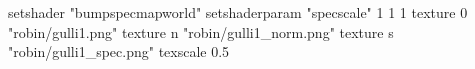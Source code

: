 setshader "bumpspecmapworld"
setshaderparam "specscale" 1 1 1
   texture 0 "robin/gulli1.png"
   texture n "robin/gulli1_norm.png"
   texture s "robin/gulli1_spec.png"
texscale 0.5
